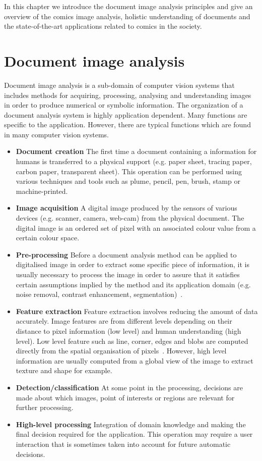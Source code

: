 In this chapter we introduce the document image analysis principles and give an overview of the comics image analysis, holistic understanding of documents and the state-of-the-art applications related to comics in the society.


\section{Document image analysis} %
\label{sec:document_image_analysis}
Document image analysis is a sub-domain of computer vision systems that includes methods for acquiring, processing, analysing and understanding images in order to produce numerical or symbolic information.
The organization of a document analysis system is highly application dependent. Many functions are specific to the application.
However, there are typical functions which are found in many computer vision systems.

\begin{itemize}
	\item \textbf{Document creation} The first time a document containing a information for humans is transferred to a physical support (e.g. paper sheet, tracing paper, carbon paper, transparent sheet).
	This operation can be performed using various techniques and tools such as plume, pencil, pen, brush, stamp or machine-printed.
	\item \textbf{Image acquisition} A digital image produced by the sensors of various devices (e.g. scanner, camera, web-cam) from the physical document.
	The digital image is an ordered set of pixel with an associated colour value from a certain colour space.
	\item \textbf{Pre-processing} Before a document analysis method can be applied to digitalised image in order to extract some specific piece of information, it is usually necessary to process the image in order to assure that it satisfies certain assumptions implied by the method and its application domain (e.g. noise removal, contrast enhancement, segmentation)~\cite{pal1993review,luccheseyz2001color,bhattacharyya2011brief}.
	\item \textbf{Feature extraction} Feature extraction involves reducing the amount of data accurately.
  Image features are from different levels depending on their distance to pixel information (low level) and human understanding (high level).
	Low level feature such as line, corner, edges and blobs are computed directly from the spatial organisation of pixels~\cite{due1996feature}.
	However, high level information are usually computed from a global view of the image to extract texture and shape for example.
	\item \textbf{Detection/classification} At some point in the processing, decisions are made about which images, point of interests or regions are relevant for further processing.
	\item \textbf{High-level processing} Integration of domain knowledge and making the final decision required for the application.
	This operation may require a user interaction that is sometimes taken into account for future automatic decisions.
\end{itemize}

